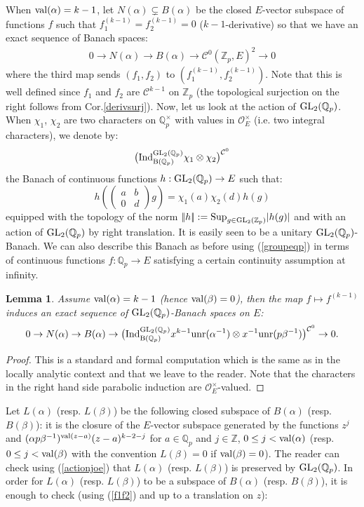 \documentclass[11pt]{amsart}
\def\Z{{\mathbb Z}_p}
\def\Q{{\mathbb Q}_p}
\def\G{{\rm GL}_2(\Q)}
\def\K{{\rm GL}_2(\Z)}
\def\B{{\rm B}(\Q)}
\def\O{{\mathcal O}_E}
\newtheorem{lem}[definit]{\bf{Lemma}}
\begin{document}
When ${\rm val}(\alpha)=k-1$, let $N(\alpha)\subsetneq B(\alpha)$ be
the closed $E$-vector subspace of functions $f$ such that
$f_1^{(k-1)}=f_2^{(k-1)}=0$ ($k-1$-derivative) so that we have an
exact sequence of Banach spaces:  
\begin{eqnarray}\label{deriv} 
0\rightarrow N(\alpha)\rightarrow B(\alpha)\rightarrow {\mathcal C}^{0}(\Z,E)^2\rightarrow 0 
\end{eqnarray} 
where the third map sends $(f_1,f_2)$ to $(f_1^{(k-1)},f_2^{(k-1)})$. 
Note that this is well defined since $f_1$ and $f_2$ are ${\mathcal
  C}^{k-1}$ on $\Z$ (the topological surjection on the right follows
from Cor.\ref{derivsurj}). Now, let us look at the action of
$\G$. When $\chi_1$, $\chi_2$ are two characters on $\Q^{\times}$ with
values in $\O^{\times}$ (i.e. two integral characters), we denote by:  
$$\big({\rm Ind}_{\B}^{\G}\chi_1\otimes \chi_2\big)^{{\mathcal C}^0}$$ 
the Banach of continuous functions $h:\G\rightarrow E$ such that:
$$h(\begin{pmatrix}a&b\\0&d\end{pmatrix}g)=\chi_1(a)\chi_2(d)h(g)$$  
equipped with the topology of the norm $|\!|h|\!|:={\rm Sup}_{g\in
  \K}|h(g)|$ and with an action of $\G$ by right translation. It is
easily seen to be a unitary $\G$-Banach. We can also describe this
Banach as before using (\ref{groupeqp}) in terms of continuous
functions $f:\Q\rightarrow E$ satisfying a certain continuity
assumption at infinity.  
 
\begin{lem}\label{exact} 
Assume ${\rm val}(\alpha)=k-1$ (hence ${\rm val}(\beta)=0$), then the
map $f\mapsto f^{(k-1)}$ induces an exact sequence of $\G$-Banach
spaces on $E$:  
$$0\rightarrow N(\alpha)\rightarrow B(\alpha)\rightarrow \big({\rm
  Ind}_{\B}^{\G}x^{k-1}{\rm unr}(\alpha^{-1})\otimes x^{-1}{\rm
  unr}(p\beta^{-1})\big)^{{\mathcal C}^0}\rightarrow 0.$$  
\end{lem} 
\begin{proof} 
This is a standard and formal computation which is the same as in the
locally analytic context and that we leave to the reader. Note that
the characters in the right hand side parabolic induction are
$\O^{\times}$-valued.  
\end{proof} 
 
Let $L(\alpha)$ (resp. $L(\beta)$) be the following closed subspace of
$B(\alpha)$ (resp. $B(\beta)$): it is the closure of the $E$-vector
subspace generated by the functions $z^j$ and $(\alpha
p\beta^{-1})^{{\rm val}(z-a)}(z-a)^{k-2-j}$ for $a\in \Q$ and $j\in
{\mathbb Z}$, $0\leq j<{\rm val}(\alpha)$ (resp. $0\leq j<{\rm
  val}(\beta)$ with the convention $L(\beta)=0$ if ${\rm
  val}(\beta)=0$). The reader can check using (\ref{actionjoe}) that
$L(\alpha)$ (resp. $L(\beta)$) is preserved by $\G$. In order for
$L(\alpha)$ (resp. $L(\beta)$) to be a subspace of $B(\alpha)$
(resp. $B(\beta)$), it is enough to check (using (\ref{f1f2}) and up
to a translation on $z$):  
 
\end{document}
